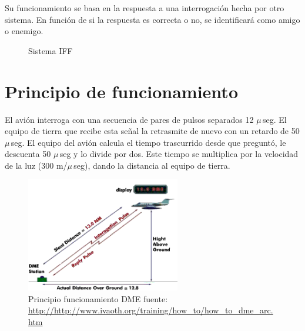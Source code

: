 Su funcionamiento se basa en la respuesta a una interrogaci\'on hecha por otro sistema. En funci\'on de si la respuesta es correcta o no, se identificar\'a como amigo o enemigo.

\begin{figure}[!htb]
  \centering

  \caption{Sistema IFF}
  \label{fig:DME.sistema.iff}
\end{figure}


\section{Principio de funcionamiento}
\label{sec:DME.principio.funcionamiento}

El avi\'on interroga con una secuencia de pares de pulsos separados 12 $\mu$\,seg. El equipo de tierra que recibe esta se\~nal la retrasmite de nuevo con un retardo de 50 $\mu$\,seg. El equipo del avi\'on calcula el tiempo trascurrido desde que pregunt\'o, le descuenta 50 $\mu$\,seg y lo divide por dos. Este tiempo se multiplica por la velocidad de la luz (300 m/$\mu$\,seg), dando la distancia al equipo de tierra.

\begin{figure}[!h]
  \centering
  \includegraphics[width=0.6\textwidth]{06.radionavegacion/Imagenes/06.04.dme.imagenes/how_to_dme_arc_Picture1.gif}
  \caption{Principio funcionamiento DME {\tiny fuente: \url{http://http://www.ivaoth.org/training/how_to/how_to_dme_arc.htm}}}
  \label{fig:DME.principio.funcionamiento}
\end{figure}

